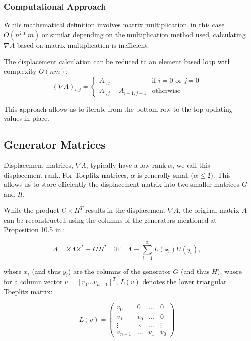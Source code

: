 \subsubsection{Computational Approach}
While mathematical definition involves matrix multiplication, in this case $O(n^2 * m)$ or similar depending on the multiplication method used,
calculating $\nabla A$ based on matrix multiplication is inefficient.

The displacement calculation can be reduced to an element based loop with complexity $O(nm)$:
\begin{equation} \label{imp:phi_plus}
    (\nabla A)_{i,j} =
    \begin{cases}
        A_{i,j}                & \text{if } i=0 \text{ or } j=0 \\
        A_{i,j} - A_{i-1, j-1} & \text{otherwise}
    \end{cases}
\end{equation}

This approach allows us to iterate from the bottom row to the top updating values in place.

\subsection{Generator Matrices}
Displacement matrices, $\nabla A$, typically have a low rank $\alpha$, we call this displacement rank.
For Toeplitz matrices, $\alpha$ is generally small ($\alpha \le 2$).
This allows us to store efficiently the displacement matrix into two smaller matrices $G$ and $H$.

While the product $G \times H^T$ results in the displacement $\nabla A$,
the original matrix $A$ can be reconstructed using the columns of the generators mentioned at Proposition 10.5 in \cite{aecf-2017-pdf}:

\begin{equation}
    A - Z A Z^T = G H^T \quad \text{iff} \quad A = \sum_{i=1}^{\alpha} L(x_i) U(y_i),
\end{equation}

where $x_i$ (and thus $y_i$) are the columns of the generator $G$ (and thus $H$), where
for a column vector $v = [v_0 \dots v_{n-1}]^T$, $L(v)$ denotes the lower triangular Toeplitz matrix:

\begin{equation*}
    L(v) = \begin{pmatrix}
        v_0 & 0 & \dots & 0 \\
        v_1 & v_0 & \dots & 0 \\
        \vdots & \ddots & \dots & \vdots \\
        v_{n-1} & \dots & v_1 & v_0
    \end{pmatrix}
\end{equation*}

